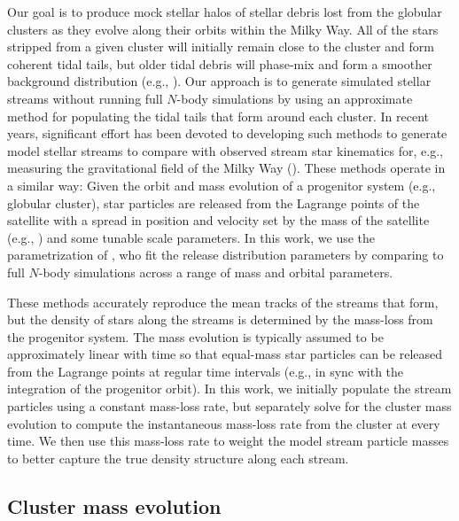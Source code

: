 \documentclass[manuscript, letterpaper]{aastex6}
\begin{document}
Our goal is to produce mock stellar halos of stellar debris lost from the
globular clusters as they evolve along their orbits within the Milky Way.
All of the stars stripped from a given cluster will initially remain close to
the cluster and form coherent tidal tails, but older tidal debris will phase-mix
and form a smoother background distribution (e.g., \citealt{Helmi:1999}).
Our approach is to generate simulated stellar streams without running full
$N$-body simulations by using an approximate method for populating the tidal
tails that form around each cluster.
In recent years, significant effort has been devoted to developing such methods
to generate model stellar streams to compare with observed stream star
kinematics for, e.g., measuring the gravitational field of the Milky Way
(\citealt{Kupper:2012,Bonaca:2014,Gibbons:2014,Bovy:2014,Fardal:2015}).
These methods operate in a similar way:
Given the orbit and mass evolution of a progenitor system (e.g., globular
cluster), star particles are released from the Lagrange points of the satellite
with a spread in position and velocity set by the mass of the satellite (e.g.,
\citealt{Johnston:1999}) and some tunable scale parameters.
In this work, we use the parametrization of \citealt{Fardal:2015}, who fit the
release distribution parameters by comparing to full $N$-body simulations across
a range of mass and orbital parameters.

These methods accurately reproduce the mean tracks of the streams that form, but
the density of stars along the streams is determined by the mass-loss from the
progenitor system.
The mass evolution is typically assumed to be approximately linear with time so
that equal-mass star particles can be released from the Lagrange points at
regular time intervals (e.g., in sync with the integration of the progenitor
orbit).
In this work, we initially populate the stream particles using a constant
mass-loss rate, but separately solve for the cluster mass evolution to compute
the instantaneous mass-loss rate from the cluster at every time.
We then use this mass-loss rate to weight the model stream particle masses
to better capture the true density structure along each stream.

\subsection{Cluster mass evolution} \label{sec:gcmassevolution}
\end{document}
